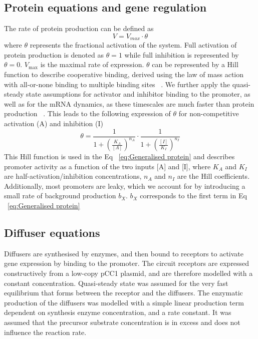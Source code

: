 \subsection{Protein equations and gene regulation}
The rate of protein production can be defined as
\begin{equation}
    V = V_{max} \cdot \theta
\end{equation}
where $\theta$ represents the fractional activation of the system. Full activation of protein production is denoted as $\theta=1$ while full inhibition is represented by $\theta=0$.
$V_{\max}$ is the maximal rate of expression.
$\theta$ can be represented by a Hill function to describe cooperative binding, derived using the law of mass action with all-or-none binding to multiple binding sites ~\parencite{Weiss1997}.
We further apply the quasi-steady state assumptions for activator and inhibitor binding to the promoter, as well as for the mRNA dynamics, as these timescales are much faster than protein production ~\parencite{Andersen1998, Bremer2008}.
This leads to the following expression of $\theta$ for non-competitive activation (A) and inhibition (I)
\begin{equation}\label{eq:\theta}
    \theta  = \frac{1}{1+\left(\frac{K_{A}}{[A]}\right)^{n_{A}}} \cdot \frac{1}{1+\left(\frac{[I]}{K_{I}}\right)^{n_{I}}}
\end{equation}
This Hill function is used in the Eq ~\eqref{eq:Generalised protein} and describes promoter activity as a function of the two inputs [A] and [I], where $K_{A}$ and $K_{I}$ are half-activation/inhibition concentrations, $n_{A}$ and $n_{I}$ are the Hill coefficients.
Additionally, most promoters are leaky, which we account for by introducing a small rate of background production $b_{X}$. $b_{X}$ corresponds to the first term in Eq ~\eqref{eq:Generalised protein}
\subsection{Diffuser equations}
Diffusers are synthesised by enzymes, and then bound to receptors to activate gene expression by binding to the promoter. %
The circuit receptors are expressed constructively from a low-copy pCC1 plasmid, and are therefore modelled with a constant concentration.
Quasi-steady state was assumed for the very fast equilibrium that forms between the receptor and the diffusers. %
The enzymatic production of the diffusers was modelled with a simple linear production term dependent on synthesis enzyme concentration, and a rate constant.
It was assumed that the precursor substrate concentration is in excess and does not influence the reaction rate.
